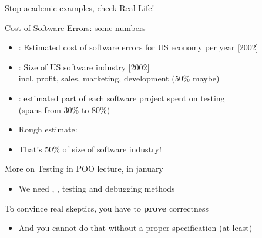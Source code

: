 \begin{frame}{Stop academic examples, check Real Life!}
  \begin{block}{Cost of Software Errors: some numbers}
    \begin{itemize}
    \item {}: Estimated cost of software errors for US
      economy per year [2002]
    \item {}: Size of US software industry [2002]\\
      {\small incl. profit, sales, marketing, development (50\% maybe)}
    \item {}: estimated part of each software project spent on
      testing\\ 
      {\small(spans from 30\% to 80\%)}

    \item Rough estimate: 
    \item That's \alert{50\% of size of software industry!}
    \end{itemize}
  \end{block}

 \begin{block}{More on Testing in POO lecture, in january}
   \begin{itemize}
   \item We need , ,  \alert{testing} and \alert{debugging} methods
   \end{itemize}
 \end{block}
  
 \begin{block}{To convince real skeptics, you have to \textbf{prove} correctness}
   \begin{itemize}
   \item And you cannot do that without a proper specification (at least)
   \end{itemize}
 \end{block}
\end{frame}
